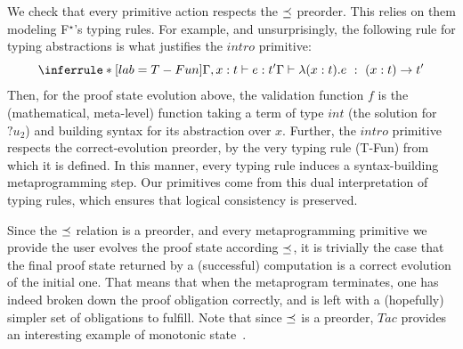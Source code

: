 \documentclass[runningheads]{llncs}
\newcommand\fstar{F$^\star$\xspace}
\newcommand\metafstar{Meta-F$^\star$\xspace}
\newcommand{\comm}[3]{\ifcheckpagebudget\else\ifdraft{{\color{#1}[#2: #3]}}\fi\fi}
\newcommand{\nik}[1]{\comm{dkpurple}{Nik}{#1}}
\newcommand{\ch}[1]{\comm{teal}{CH}{#1}}
\newcommand{\guido}[1]{\comm{blue}{Guido}{#1}}
\newcommand{\cpc}[1]{\comm{brown}{Cl\'ement}{#1}}
\begin{document}
We check that every primitive action respects the $\preceq$ preorder.
%
This relies on them modeling \fstar's typing rules.
%
For example, and unsurprisingly, the following rule for typing abstractions
is what justifies the \ls$intro$ primitive:
%
\[
   \inferrule*[lab=T-Fun]
   {
     \Gamma, x:t |- e : t'
   }
   {
     \Gamma |- \lambda(x:t).e ~:~ (x:t) -> t'
   }
\]
%
Then, for the proof state evolution above,
the validation function $f$
is the (mathematical, meta-level) function taking a term of type
$int$ (the solution for \ls$?u_2$) and building syntax for its abstraction over $x$.
%
Further, the \ls$intro$ primitive
respects the correct-evolution
preorder, by the very typing rule (T-Fun) from which it is defined.
%
In this manner, every typing rule induces a
syntax-building metaprogramming step.
%
Our primitives come from this dual interpretation of typing rules,
which ensures that logical consistency is preserved.




Since the $\preceq$ relation is a preorder, and every metaprogramming
primitive we provide the user evolves the proof state according $\preceq$, it is trivially the
case that the final proof state returned by a (successful)
computation is a correct evolution of the initial one.
%
That means that when the metaprogram terminates, one
has indeed broken down the proof obligation correctly,
and is left with a
(hopefully) simpler set of obligations to fulfill.
%
%
%
%
Note that since $\preceq$ is a preorder, \ls$Tac$
provides an interesting example of monotonic state~\cite{preorders}.
\end{document}
